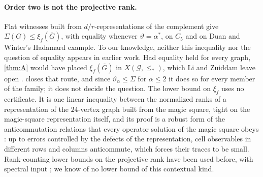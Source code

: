 \documentclass[11pt]{article}
\theoremstyle{definition}
\newcommand{\vt}{\vartheta}
\newcommand{\cG}{\mathcal G}
\newcommand{\Xs}{X(\cG,\le_*)}
\begin{document}
\paragraph{Order two is not the projective rank.}
Flat witnesses built from $d/r$-representations of the complement give
$\Sigma(G)\le\xi_f(\overline G)$, with equality whenever $\vt=\alpha^*$, on
$C_5$ and on Duan and Winter's Hadamard example.  To our knowledge, neither
this inequality nor the question of equality appears in earlier work.  Had
equality
held for every graph, \cref{thm:A} would have placed $\xi_f(\overline G)$ in
$\Xs$, which Li and Zuiddam leave open \cite[after Proposition~24]{LiZuiddam2020}.
 closes that route, and since $\vt_\alpha\le\Sigma$ for
$\alpha\le2$ it does so for every member of the family; it does not decide
the question.  The
lower bound on $\xi_f$ uses no certificate.  It is one linear inequality
between the normalized ranks of a representation of the $24$-vertex graph
built from the magic square,
tight on the magic-square representation itself, and its proof is a robust
form of the anticommutation relations that every operator solution of the
magic square obeys \cite[Lemma~6]{Ji2013}: up to errors controlled by the
defects of the representation, cell observables in different rows and
columns anticommute, which forces their traces to be small.  Rank-counting
lower bounds on the projective rank have been used before, with spectral
input \cite{WocjanElphick2019}; we know of no lower bound of this
contextual kind.
\end{document}
